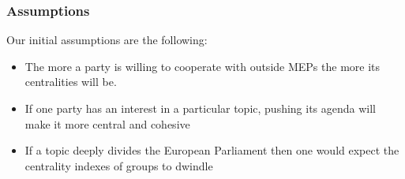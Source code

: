 \documentclass{beamer}
\begin{document}
\begin{frame}
\frametitle{Assumptions}

Our initial assumptions are the following:
\bigskip
\begin{itemize}
	\pause \item The more a party is willing to cooperate with outside MEPs the more its centralities will be.

	\pause \item If one party has an interest in a particular topic, pushing its agenda will make it more central and cohesive
	
	\pause \item If a topic deeply divides the European Parliament then one would expect the centrality indexes of groups to dwindle 
\end{itemize}
\end{frame}
\end{document}
